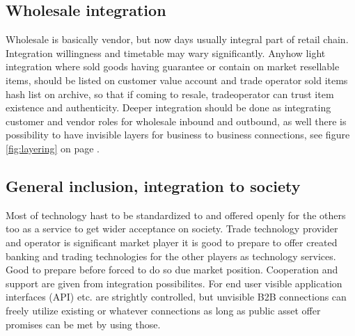 \subsection{Wholesale integration}
\label{wholesale}
Wholesale is basically vendor, but now days usually integral part of retail chain. Integration willingness and timetable may wary significantly. Anyhow light integration where sold goods having guarantee or contain on market resellable items, should be listed on customer value account and trade operator sold items hash list on archive, so that if coming to resale, tradeoperator can trust item existence and authenticity. Deeper integration should be done as integrating customer and vendor roles for wholesale inbound and outbound, as well there is possibility to have invisible layers for business to business connections, see figure \ref{fig:layering} on page \pageref{fig:layering}.

\subsection{General inclusion, integration to society}
\label{inclusion}

Most of technology hast to be standardized to and offered openly for the others too as a service to get wider acceptance on society. Trade technology provider and operator is significant market player it is good to prepare to offer created banking and trading technologies for the other players as technology services. Good to prepare before forced to do so due market position. Cooperation and support are given from integration possibilites. For end user visible application interfaces (API) etc. are strightly controlled, but unvisible B2B connections can freely utilize existing or whatever connections as long as public asset offer promises can be met by using those.


